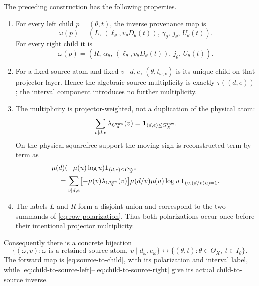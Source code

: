 \begin{theorem}
\label{thm:source-child-reconstruction}
The preceding construction has the following properties.
\begin{enumerate}[label=(\roman*),leftmargin=2.2em]
\item For every left child \(p=(\theta,t)\), the inverse provenance
map is
\begin{equation}
 \omega(p)
 =
 \left(
 L,\,
 (\ell_\theta,v_\theta D_\theta(t)),\,
 \gamma_\theta,\,
 j_\theta,\,
 U_\theta(t)
 \right).
\label{eq:child-to-source-left}
\end{equation}
For every right child it is
\begin{equation}
 \omega(p)
 =
 \left(
 R,\,
 \alpha_\theta,\,
 (\ell_\theta,v_\theta D_\theta(t)),\,
 j_\theta,\,
 U_\theta(t)
 \right).
\label{eq:child-to-source-right}
\end{equation}
\item For a fixed source atom and fixed \(v\mid d,e\),
\((\theta,t_{\omega,v})\) is its unique child on that projector
layer.  Hence the algebraic source multiplicity is exactly
\(\tau((d,e))\); the interval component introduces no further
multiplicity.
\item The multiplicity is projector-weighted, not a duplication of
the physical atom:
\begin{equation}
 \sum_{v\mid d,e}\lambda_{G_X^{\rm row}}(v)
 =
 \mathbf 1_{(d,e)\le G_X^{\rm row}}.
\label{eq:source-projector-multiplicity}
\end{equation}
On the physical squarefree support the moving sign is reconstructed
term by term as
\begin{align}
 &\mu(d)(-\mu(u)\log u)
 \mathbf 1_{(d,e)\le G_X^{\rm row}}
\notag\\
 &\quad=
 \sum_{v\mid d,e}
 \bigl[-\mu(v)\lambda_{G_X^{\rm row}}(v)\bigr]
 \mu(d/v)\mu(u)\log u\,
 \mathbf 1_{(v,(d/v)u)=1}.
\label{eq:source-sign-reassembly}
\end{align}
\item The labels \(L\) and \(R\) form a disjoint union and correspond
to the two summands of \eqref{eq:row-polarization}.  Thus both
polarizations occur once before their intentional projector
multiplicity.
\end{enumerate}
Consequently there is a concrete bijection
\[
 \{(\omega,v):\omega\text{ is a retained source atom},\
                 v\mid d_\omega,e_\omega\}
 \longleftrightarrow
 \{(\theta,t):\theta\in\Theta_X,\ t\in I_\theta\}.
\]
The forward map is \eqref{eq:source-to-child}, with its polarization
and interval label, while
\eqref{eq:child-to-source-left}--\eqref{eq:child-to-source-right}
give its actual child-to-source inverse.
\end{theorem}

